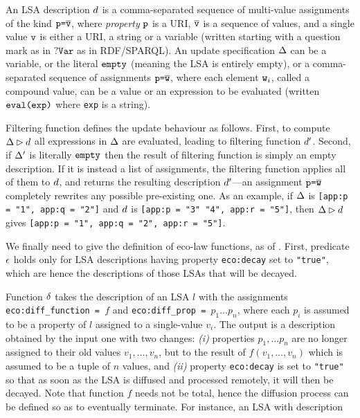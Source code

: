 \documentclass[12pt,a4paper,twoside,openright]{book}
\begin{document}
An LSA description $d$ is a comma-separated sequence of multi-value assignments of the kind $\texttt{p} \texttt{=} \overline{\texttt{v}}$, where \emph{property} $\texttt{p}$ is a URI, $\overline{\texttt{v}}$ is a sequence of values, and a single value $\texttt{v}$ is either a URI, a string or a variable (written starting with a question mark as in $\texttt{?Var}$ as in RDF/SPARQL).
%
An update specification $\Delta$ can be a variable, or the literal $\texttt{empty}$ (meaning the LSA is entirely empty), or a comma-separated sequence of assignments $\texttt{p}\texttt{=} \overline{\texttt{w}}$, where each element $\texttt{w}_i$, called a compound value, can be a value or an expression to be evaluated (written $\texttt{eval(exp)}$ where \texttt{exp} is a string).

Filtering function defines the update behaviour as follows.
%
First, to compute $\Delta\rhd d$ all expressions in $\Delta$ are evaluated, leading to filtering function $d'$.
%
Second, if $\Delta'$ is literally $\texttt{empty}{}$ then the result of filtering function is simply an empty description.
%
If it is instead a list of assignments, the filtering function applies all of them to $d$, and returns the resulting description $d'$---an assignment $\texttt{p}\texttt{=} \overline{\texttt{w}}$ completely rewrites any possible pre-existing one.
%
As an example, if $\Delta$ is \mbox{\texttt{[app:p = "1", app:q = "2"]}} and $d$ is \mbox{\texttt{[app:p = "3" "4", app:r = "5"]}}, then $\Delta\rhd d$ gives \mbox{\texttt{[app:p = "1", app:q = "2", app:r = "5"]}}.

We finally need to give the definition of eco-law functions, as of .
%
First, predicate $\epsilon$ holds only for LSA descriptions having property \texttt{eco:decay} set to \texttt{"true"}, which are hence the descriptions of those LSAs that will be decayed.

Function $\delta$ takes the description of an LSA $l$ with the assignments \texttt{eco:diff\_function = $f$} and \texttt{eco:diff\_prop = $p_1 \ldots p_n$}, where each $p_i$ is assumed to be a property of $l$ assigned to a single-value $v_i$.
%
The output is a description obtained by the input one with two changes: \emph{(i)} properties $p_1,\ldots p_n$ are no longer assigned to their old values $v_1,\ldots,v_n$, but to the result of $f(v_1,\ldots,v_n)$ which is assumed to be a tuple of $n$ values, and \emph{(ii)} property \texttt{eco:decay} is set to \texttt{"true"} so that as soon as the LSA is diffused and processed remotely, it will then be decayed.
%
Note that function $f$ needs not be total, hence the diffusion process can be defined so as to eventually terminate.
%
For instance, an LSA with description
\end{document}
